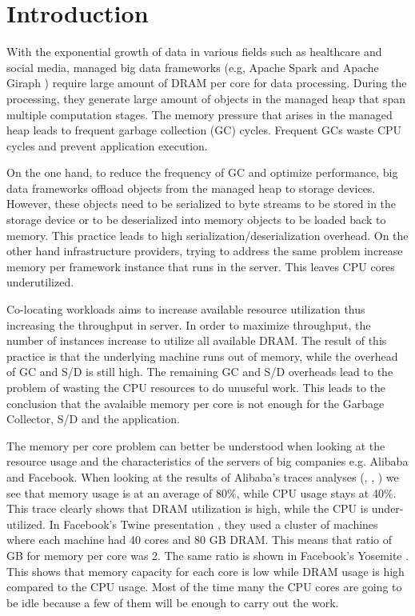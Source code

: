 \section{Introduction}
\label{sec:intro}
With the exponential growth of data in various fields such as
healthcare and social media, managed big data frameworks (e.g, Apache
Spark \cite{Spark} and Apache Giraph \cite{Giraph}) require large
amount of DRAM per core for data processing. During the processing, they generate large
amount of objects in the managed heap that span multiple computation
stages. The memory pressure that arises in the managed heap leads to
frequent garbage collection (GC) cycles. Frequent GCs waste CPU cycles 
and prevent application execution.

On the one hand, to reduce the frequency of GC and optimize performance, big data
frameworks offload objects from the managed heap to storage devices. However, these
objects need to be serialized to byte streams to be stored in the storage
device or to be deserialized into memory objects to be loaded back to memory. 
This practice leads to high serialization/deserialization overhead.
On the other hand infrastructure providers, trying to address the same problem increase memory per framework instance that runs in the server. This leaves CPU cores underutilized. 

Co-locating workloads aims to increase available resource utilization
thus increasing the throughput in server. 
In order to maximize throughput, the number of instances
increase to utilize all available DRAM. The result of this
practice is that the underlying machine runs out of memory, while the
 overhead of GC and S/D is still high. The remaining GC and S/D
overheads lead to the problem of wasting the CPU resources
to do unuseful work. This leads to the conclusion that the avalaible memory per core is
not enough for the Garbage Collector, S/D and the application.

The memory per core problem can better be understood when looking at
the resource usage and the characteristics of the servers of big
companies e.g. Alibaba and Facebook. When looking at the results of
Alibaba's traces analyses (\cite{Alibaba}, \cite{Alibaba1},
\cite{Alibabacolocated}) we see that memory usage is at an average of
80\%, while CPU usage stays at 40\%. This trace clearly shows that
DRAM utilization is high, while the CPU is under-utilized. In
Facebook's Twine presentation \cite{Twine}, they used a cluster of
machines where each machine had 40 cores and 80 GB DRAM. This means
that ratio of GB for memory per core was 2. The same ratio is shown in Facebook's Yosemite
\cite{Yosemite}. This shows that memory
capacity for each core is low while DRAM usage is high compared to the CPU usage. Most of the time many the CPU cores are
going to be idle because a few of them will be enough to carry out the
work.

